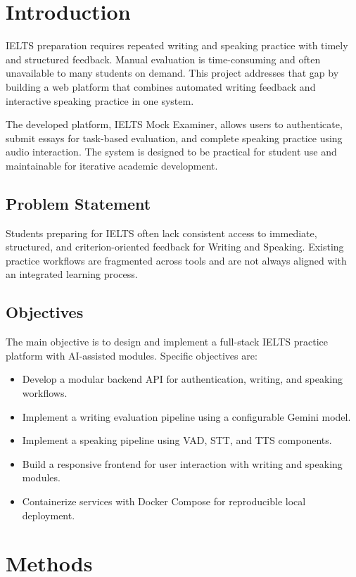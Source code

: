 ﻿\documentclass[conference]{IEEEtran}
\begin{document}
\section{Introduction}
IELTS preparation requires repeated writing and speaking practice with timely and structured feedback. Manual evaluation is time-consuming and often unavailable to many students on demand. This project addresses that gap by building a web platform that combines automated writing feedback and interactive speaking practice in one system.

The developed platform, IELTS Mock Examiner, allows users to authenticate, submit essays for task-based evaluation, and complete speaking practice using audio interaction. The system is designed to be practical for student use and maintainable for iterative academic development.

\subsection{Problem Statement}
Students preparing for IELTS often lack consistent access to immediate, structured, and criterion-oriented feedback for Writing and Speaking. Existing practice workflows are fragmented across tools and are not always aligned with an integrated learning process.

\subsection{Objectives}
The main objective is to design and implement a full-stack IELTS practice platform with AI-assisted modules. Specific objectives are:
\begin{itemize}
    \item Develop a modular backend API for authentication, writing, and speaking workflows.
    \item Implement a writing evaluation pipeline using a configurable Gemini model.
    \item Implement a speaking pipeline using VAD, STT, and TTS components.
    \item Build a responsive frontend for user interaction with writing and speaking modules.
    \item Containerize services with Docker Compose for reproducible local deployment.
\end{itemize}

\section{Methods}
\end{document}
